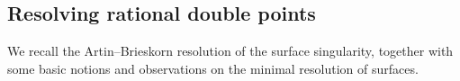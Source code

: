 \documentclass[11pt, letterpaper]{amsart}
\theoremstyle{plain}
\newtheorem{proposition}[theorem]{Proposition}
\theoremstyle{definition}
\newtheorem{remark}[theorem]{Remark}
\newcommand\tensor{{\otimes}}
\newcommand{\<}{\langle}
\renewcommand{\>}{\rangle}
\newcommand{\into}{\hookrightarrow}
\newcommand{\Gal}{\mathrm{Gal}}
\begin{document}
\subsection{Resolving rational double points}
\label{sub:RDP}
We recall the Artin--Brieskorn resolution of the surface singularity, together with some basic notions and observations on the minimal resolution of surfaces.

\end{document}
